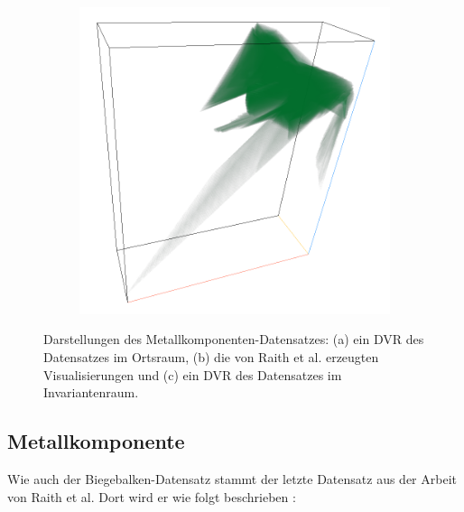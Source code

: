 \documentclass[a4paper,fontsize=12pt,toc=bib,parskip=half,ngerman]{scrartcl}
\begin{document}
\begin{figure}
\begin{subfigure}{0.45\textwidth}
		\subcaption{}
		\label{NodelRaith}
	\end{subfigure}	
	\hspace*{\fill}
	\begin{subfigure}{0.3\textwidth}
		\centering
		\includegraphics[width=\textwidth]{pictures/results/Nodel/Nodel_InvariantSpace.png}
		\subcaption{}
		\label{NodelInvariant}
	\end{subfigure}
	\caption{Darstellungen des Metallkomponenten-Datensatzes: (a) ein DVR des Datensatzes im Ortsraum, (b) die von Raith et al. erzeugten Visualisierungen und (c) ein DVR des Datensatzes im Invariantenraum.}
	\label{Nodel}
\end{figure}

\subsection{Metallkomponente}
Wie auch der Biegebalken-Datensatz stammt der letzte Datensatz aus der Arbeit von Raith et al. Dort wird er wie folgt beschrieben \cite[S.~1129]{raith2019tensor}:
\end{document}
